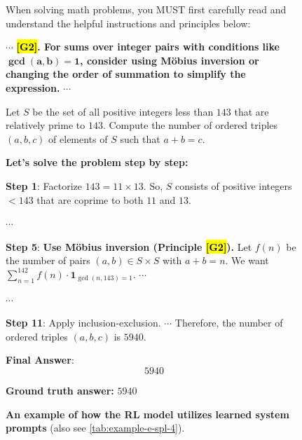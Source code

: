 \documentclass{article}
\theoremstyle{plain}
\theoremstyle{definition}
\theoremstyle{remark}
\begin{document}
\begin{figure}[t]
\centering
\vspace{-6pt}
\caption{\textbf{An example of how the RL model utilizes learned system prompts} (also see \autoref{tab:example-e-spl-4}).}
\vspace{-6pt}
\begin{runcard}[title={Example of How E-SPL Shapes Model Behavior}]

\medskip

\begin{runbox}[title={\textbf{Learned System Prompt}}]
When solving math problems, you MUST first carefully read and understand the helpful instructions and principles below:

$\cdots$ \quad \textbf{\color{Brown}\hl{{[G2]}}. For sums over integer pairs with conditions like $\boldsymbol{\gcd(a,b)=1}$, consider using Möbius inversion or changing the order of summation to simplify the expression.} \quad $\cdots$

\end{runbox}

\begin{runbox}[title={Problem}]
Let $S$ be the set of all positive integers less than $143$ that are relatively prime to $143$. Compute the number of ordered triples $(a,b,c)$ of elements of $S$ such that $a+b=c$.

\end{runbox}

\begin{runbox}[title={Model Output}]

\textbf{Let's solve the problem step by step:}

\textbf{Step 1}: Factorize \( 143 = 11 \times 13 \). So, \( S \) consists of positive integers \( < 143 \) that are coprime to both $11$ and $13$.

\quad $\cdots$

\textbf{Step 5}: {\textbf{\color{Brown}Use Möbius inversion (Principle \hl{[G2]}).} Let \( f(n) \) be the number of pairs \( (a, b) \in S \times S \) with \( a + b = n \). We want \( \sum_{n=1}^{142} f(n) \cdot \mathbf{1}_{\gcd(n,143)=1} \). \quad $\cdots$}

\quad $\cdots$

\textbf{Step 11}: Apply inclusion-exclusion. \quad $\cdots$ \quad Therefore, the number of ordered triples $(a,b,c)$ is $5940$.

\textbf{Final Answer}:
\[
\boxed{5940}
\]

\end{runbox}

\textbf{Ground truth answer:} $5940$
\end{runcard}
\label{tab:example-e-spl-4-short}
\vspace{-12pt}
\end{figure}
\end{document}
